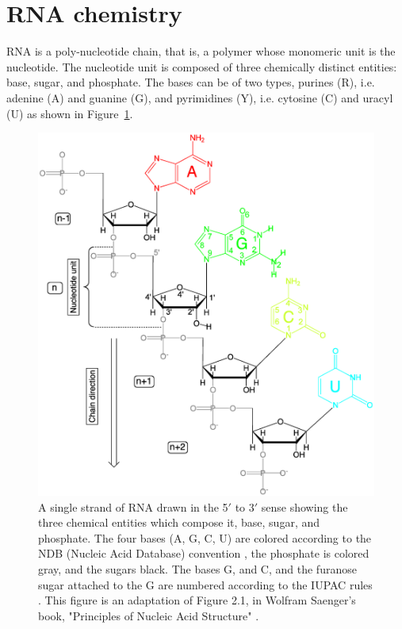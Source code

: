 \section{RNA chemistry}
\label{sec:rnachem}
RNA is  a poly-nucleotide  chain, that is,  a polymer  whose monomeric
unit  is the  nucleotide.  The  nucleotide unit  is composed  of three
chemically distinct  entities: base,  sugar, and phosphate.  The bases
can be  of two types, purines  (R), i.e. adenine (A)  and guanine (G),
and  pyrimidines (Y), i.e.  cytosine (C)  and uracyl  (U) as  shown in
Figure~\ref{fig:chemistry1}.
\begin{figure}
\centering
\includegraphics[scale=0.8]{Chapter1/chemistry1b.png}
\caption{A  single strand  of  RNA drawn  in  the 5$'$  to 3$'$  sense
  showing the  three chemical entities which compose  it, base, sugar,
  and phosphate.  The four bases (A, G, C, U) are colored according to
  the  NDB  (Nucleic  Acid  Database)  convention  \cite{ndburl},  the
  phosphate is colored gray, and the sugars black. The bases G, and C,
  and the furanose  sugar attached to the G  are numbered according to
  the IUPAC  rules \cite{iupac1983}. This  figure is an  adaptation of
  Figure 2.1,  in Wolfram Saenger's book, "Principles  of Nucleic Acid
  Structure" \cite{saenger1984}.}
\label{fig:chemistry1}
\end{figure}  

